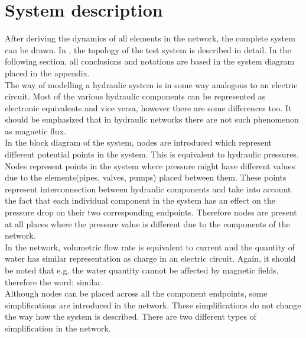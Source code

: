 \section{System description}  
\label{SystemModel}

After deriving the dynamics of all elements in the network, the complete system can be drawn. In , the topology of the test system is described in detail. In the following section, all conclusions and notations are based in the system diagram placed in the appendix. 
\\
The way of modelling a hydraulic system is in some way analogous to an electric circuit. Most of the various hydraulic components can be represented as electronic equivalents and vice versa, however there are some differences too. It should be emphasized that in hydraulic networks there are not such phenomenon as magnetic flux. 
\\
In the block diagram of the system, nodes are introduced which represent different potential points in the system. This is equivalent to hydraulic pressures. Nodes represent points in the system where pressure might have different values due to the elements(pipes, valves, pumps) placed between them. These points represent interconnection between hydraulic components and take into account the fact that each individual component in the system has an effect on the pressure drop on their two corresponding endpoints. Therefore nodes are present at all places where the pressure value is different due to the components of the network. 
\\
In the network, volumetric flow rate is equivalent to current and the quantity of water has similar representation as charge in an electric circuit. Again, it should be noted that e.g. the water quantity cannot be affected by magnetic fields, therefore the word: similar.
\\ 
Although nodes can be placed across all the component endpoints, some simplifications are introduced in the network. These simplifications do not change the way how the system is described. There are two different types of simplification in the network. %


